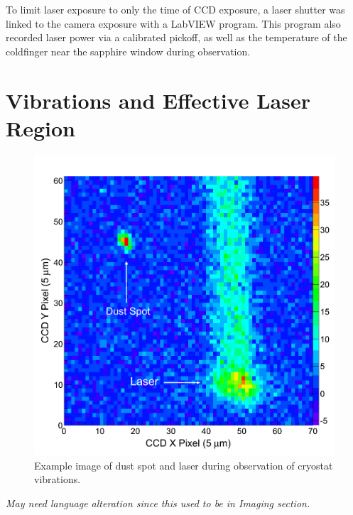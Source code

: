 To limit laser exposure to only the time of CCD exposure, a laser shutter was linked to the camera exposure with a LabVIEW program.  This program also recorded laser power via a calibrated pickoff, as well as the temperature of the coldfinger near the sapphire window during observation.

\section{Vibrations and Effective Laser Region}

\begin{figure} %
        \centering
                \includegraphics[width=.6\textwidth]{figures/image_dustspot.png}
                \caption{Example image of dust spot and laser during observation of cryostat vibrations.}
\label{fig:dustspot}
\end{figure}

\emph{\color{gray}May need language alteration since this used to be in Imaging section.}

